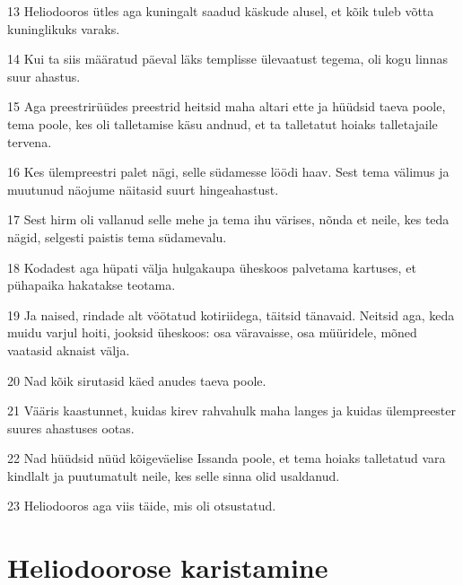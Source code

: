 \par 13 Heliodooros ütles aga kuningalt saadud käskude alusel, et kõik tuleb võtta kuninglikuks varaks.
\par 14 Kui ta siis määratud päeval läks templisse ülevaatust tegema, oli kogu linnas suur ahastus.
\par 15 Aga preestrirüüdes preestrid heitsid maha altari ette ja hüüdsid taeva poole, tema poole, kes oli talletamise käsu andnud, et ta talletatut hoiaks talletajaile tervena.
\par 16 Kes ülempreestri palet nägi, selle südamesse löödi haav. Sest tema välimus ja muutunud näojume näitasid suurt hingeahastust.
\par 17 Sest hirm oli vallanud selle mehe ja tema ihu värises, nõnda et neile, kes teda nägid, selgesti paistis tema südamevalu.
\par 18 Kodadest aga hüpati välja hulgakaupa üheskoos palvetama kartuses, et pühapaika hakatakse teotama.
\par 19 Ja naised, rindade alt vöötatud kotiriidega, täitsid tänavaid. Neitsid aga, keda muidu varjul hoiti, jooksid üheskoos: osa väravaisse, osa müüridele, mõned vaatasid aknaist välja.
\par 20 Nad kõik sirutasid käed anudes taeva poole.
\par 21 Vääris kaastunnet, kuidas kirev rahvahulk maha langes ja kuidas ülempreester suures ahastuses ootas.
\par 22 Nad hüüdsid nüüd kõigeväelise Issanda poole, et tema hoiaks talletatud vara kindlalt ja puutumatult neile, kes selle sinna olid usaldanud.
\par 23 Heliodooros aga viis täide, mis oli otsustatud.


\section*{Heliodoorose karistamine}

